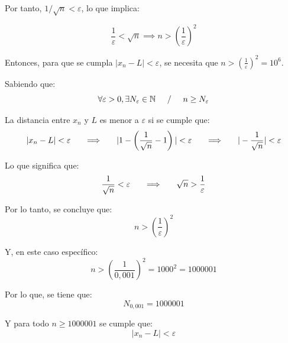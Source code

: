 \documentclass{article}
\begin{document}
Por tanto, $1/\sqrt{n} < \varepsilon$, lo que implica:

\begin{equation}
\frac{1}{\varepsilon} < \sqrt{n} \implies n > \left(\frac{1}{\varepsilon}\right)^2
\end{equation}

Entonces, para que se cumpla $\left| x_{n} - L \right| < \varepsilon$, se necesita que $n > \left(\frac{1}{\varepsilon}\right)^2 = 10^6$.

\noindent Sabiendo que:
\begin{equation}
\forall \varepsilon > 0, \exists N_{\varepsilon} \in \mathbb{N} \hspace{5mm} / \hspace{5mm} n \geq N_{\varepsilon}
\end{equation}

\noindent La distancia entre $x_{n}$ y $L$ es menor a $\varepsilon$ si se cumple que:
\begin{equation}
| x_{n} - L | < \varepsilon \hspace{5mm} \implies \hspace{5mm} | 1 - \left( \frac{1}{\sqrt{n}} - 1 \right) | < \varepsilon \hspace{5mm} \implies \hspace{5mm} | - \frac{1}{\sqrt{n}} | < \varepsilon
\end{equation}

\noindent Lo que significa que:
\begin{equation}
\frac{1}{\sqrt{n}} < \varepsilon \hspace{5mm} \implies \hspace{5mm} \sqrt{n} > \frac{1}{\varepsilon}
\end{equation}

\noindent Por lo tanto, se concluye que:
\begin{equation}
n > \left( \frac{1}{\varepsilon} \right)^2
\end{equation}

\noindent Y, en este caso específico:
\begin{equation}
n > \left( \frac{1}{0,001} \right)^2 = 1000^2 = 1000001
\end{equation}

\noindent Por lo que, se tiene que:
\begin{equation}
N_{0,001} = 1000001
\end{equation}

\noindent Y para todo $n \geq 1000001$ se cumple que:
\begin{equation}
| x_{n} - L | < \varepsilon
\end{equation}
\end{document}
